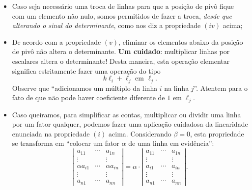 \documentclass[../livro.tex]{subfiles}  %
\begin{document}
\begin{itemize}
\item Caso seja necessário uma troca de linhas para que a posição de pivô fique com um elemento não nulo, somos permitidos de fazer a troca, \textit{desde que alterando o sinal do determinante}, como nos diz a propriedade $(iv)$ acima;
\item De acordo com a propriedade $(v)$, eliminar os elementos abaixo da posição de pivô não altera o determinante. \textbf{Um cuidado}: multiplicar linhas por escalares altera o determinante! Desta maneira, esta operação elementar significa estritamente fazer uma operação do tipo
\begin{equation}
k \ell_i + \ell_j \text{ em } \ell_j.
\end{equation} Observe que ``adicionamos um múltiplo da linha $i$ na linha $j$''. Atentem para o fato de que não pode haver coeficiente diferente de $1$ em $\ell_j$.
\item Caso queiramos, para simplificar as contas, multiplicar ou dividir uma linha por um fator qualquer, podemos fazer uma aplicação cuidadosa da linearidade enunciada na propriedade $(i)$ acima. Considerando $\beta = 0$, esta propriedade se transforma em ``colocar um fator $\alpha$ de uma linha em evidência'':
\begin{equation}
\left| \begin{matrix}
a_{11} & \cdots & a_{1n} \\
\vdots &  & \vdots \\
\alpha a_{i1} & \cdots & \alpha a_{in} \\
\vdots &  & \vdots \\
a_{n1} & \cdots & a_{nn}
\end{matrix} \right|  = 
\alpha \cdot \left| \begin{matrix}
a_{11} & \cdots & a_{1n} \\
\vdots &  & \vdots \\
a_{i1} & \cdots & a_{in} \\
\vdots &  & \vdots \\
a_{n1} & \cdots & a_{nn}
\end{matrix}\right| .
\end{equation}
\end{itemize}
\end{document}
